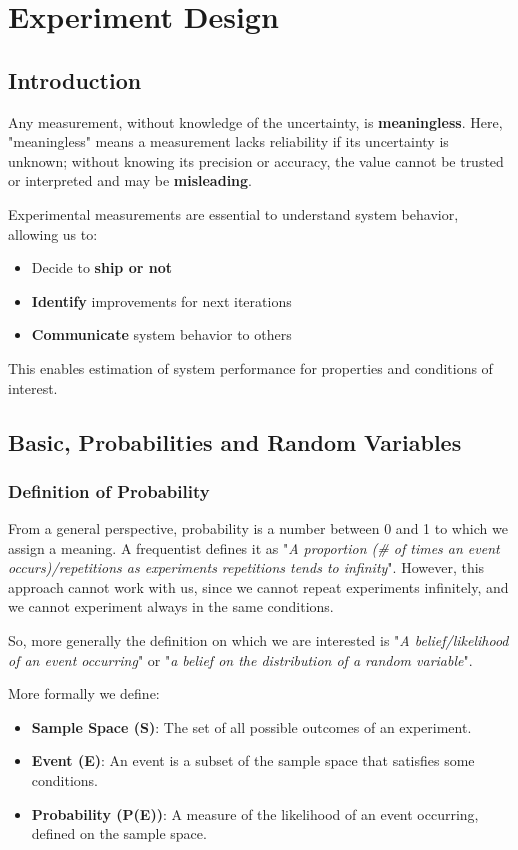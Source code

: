 \section{Experiment Design} %

\subsection{Introduction}
Any measurement, without knowledge of the uncertainty, is \textbf{meaningless}.
Here, "meaningless" means a measurement lacks reliability if its uncertainty is unknown; without knowing its precision or accuracy, the value cannot be trusted or interpreted and may be \textbf{misleading}.

Experimental measurements are essential to understand system behavior, allowing us to:
\begin{itemize}
    \item Decide to \textbf{ship or not}
    \item \textbf{Identify} improvements for next iterations
    \item \textbf{Communicate} system behavior to others
\end{itemize}
This enables estimation of system performance for properties and conditions of interest.

\subsection{Basic, Probabilities and Random Variables}

\subsubsection{Definition of Probability}
From a general perspective, probability is a number between 0 and 1 to which we assign a meaning.
A frequentist defines it as "\textit{A proportion (\# of times an event occurs)/repetitions as experiments repetitions tends to infinity}".
However, this approach cannot work with us, since we cannot repeat experiments infinitely, and we cannot experiment always in the same conditions.

So, more generally the definition on which we are interested is "\textit{A belief/likelihood of an event occurring}" or  "\textit{a belief on the distribution of a random variable}".

More formally we define:
\begin{itemize}
    \item \textbf{Sample Space (S)}: The set of all possible outcomes of an experiment.
    \item \textbf{Event (E)}: An event is a subset of the sample space that satisfies some conditions.
    \item \textbf{Probability (P(E))}: A measure of the likelihood of an event occurring, defined on the sample space.
\end{itemize}

